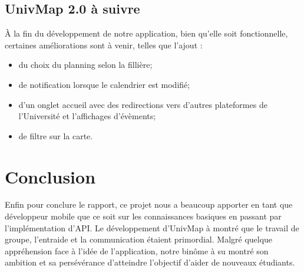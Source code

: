 \documentclass{article}
\begin{document}
\subsection{UnivMap 2.0 à suivre}
À la fin du développement de notre application,  bien qu'elle soit fonctionnelle, certaines améliorations sont à venir, telles que l'ajout :
\begin{itemize}
    \item du choix du planning selon la fillière;

    \item de notification lorsque le calendrier est modifié;

    \item d'un onglet accueil avec des redirections vers d'autres plateformes de l'Université et l'affichages d'évèments;
    
    \item de filtre sur la carte.
    
\end{itemize}



\section{Conclusion}


Enfin pour conclure le rapport, ce projet nous a beaucoup apporter en tant que développeur mobile
que ce soit sur les connaissances basiques en passant par l'implémentation d'API. Le développement d'UnivMap
à montré que le travail de groupe, l'entraide et la communication étaient primordial.
Malgré quelque appréhension face à l'idée de l'application, notre binôme à su montré son ambition et
sa persévérance d'atteindre l'objectif d'aider de nouveaux étudiants.







\end{document}
